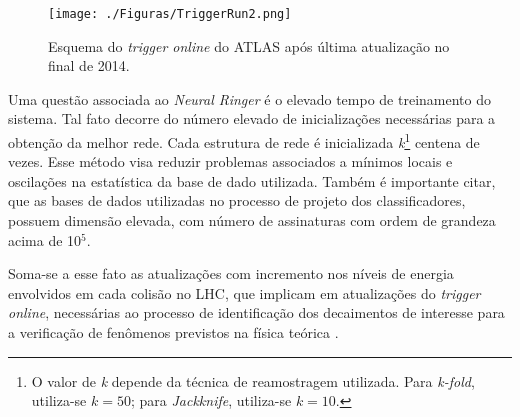 \begin{figure}[H]
	\begin{center}         
		\caption{Esquema do \emph{trigger online} do ATLAS após última atualização no final de 2014.}%
		\texttt{[image: ./Figuras/TriggerRun2.png]}
		\label{fig:triggerRUN2}
	\end{center}
\end{figure}



Uma questão associada ao \emph{Neural Ringer} é o elevado tempo de treinamento do sistema. Tal fato decorre do número elevado de inicializações necessárias para a obtenção da melhor rede. Cada estrutura de rede é inicializada \textit{k}\footnote{O valor de \textit{k} depende da técnica de reamostragem utilizada. Para \textit{k-fold}, utiliza-se $k=50$; para \textit{Jackknife}, utiliza-se $k=10$.} centena de vezes. Esse método visa reduzir problemas associados a mínimos locais e oscilações na estatística da base de dado utilizada. Também é importante citar, que as bases de dados utilizadas no processo de projeto dos classificadores, possuem dimensão elevada, com número de assinaturas com ordem de grandeza acima de 10$^5$.


Soma-se a esse fato as atualizações com incremento nos níveis de energia envolvidos em cada colisão no LHC, que implicam em atualizações do \textit{trigger online}, necessárias ao processo de identificação dos decaimentos de interesse para a verificação de fenômenos previstos na física teórica \cite{moreira2009, pimenta2013}. 

